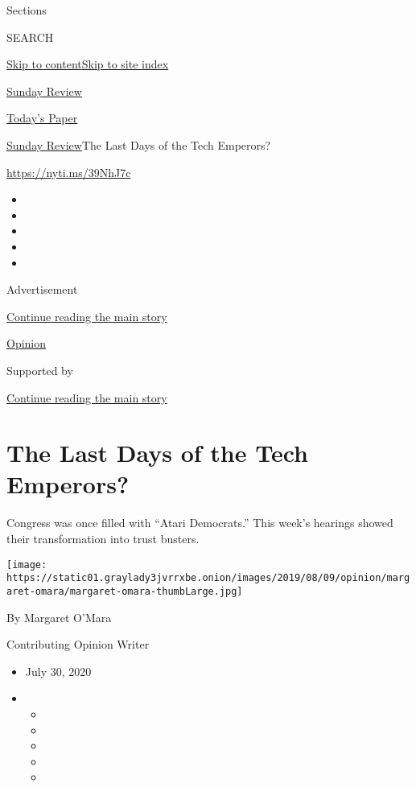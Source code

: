 Sections

SEARCH

\protect\hyperlink{site-content}{Skip to
content}\protect\hyperlink{site-index}{Skip to site index}

\href{https://www.nytimes3xbfgragh.onion/section/opinion/sunday}{Sunday
Review}

\href{https://myaccount.nytimes3xbfgragh.onion/auth/login?response_type=cookie\&client_id=vi}{}

\href{https://www.nytimes3xbfgragh.onion/section/todayspaper}{Today's
Paper}

\href{/section/opinion/sunday}{Sunday Review}\textbar{}The Last Days of
the Tech Emperors?

\url{https://nyti.ms/39NhJ7c}

\begin{itemize}
\item
\item
\item
\item
\item
\end{itemize}

Advertisement

\protect\hyperlink{after-top}{Continue reading the main story}

\href{/section/opinion}{Opinion}

Supported by

\protect\hyperlink{after-sponsor}{Continue reading the main story}

\hypertarget{the-last-days-of-the-tech-emperors}{%
\section{The Last Days of the Tech
Emperors?}\label{the-last-days-of-the-tech-emperors}}

Congress was once filled with ``Atari Democrats.'' This week's hearings
showed their transformation into trust busters.

\texttt{[image: https://static01.graylady3jvrrxbe.onion/images/2019/08/09/opinion/margaret-omara/margaret-omara-thumbLarge.jpg]}

By Margaret O'Mara

Contributing Opinion Writer

\begin{itemize}
\item
  July 30, 2020
\item
  \begin{itemize}
  \item
  \item
  \item
  \item
  \item
  \end{itemize}
\end{itemize}

